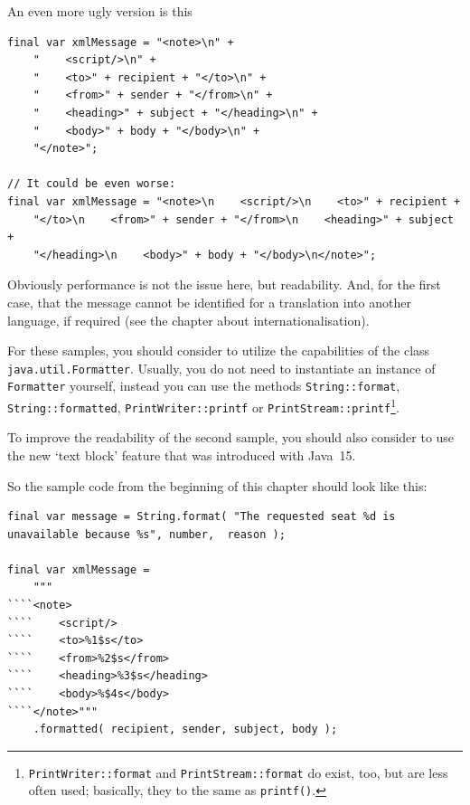 An even more ugly version is this
\begin{lstlisting}
final var xmlMessage = "<note>\n" +
    "    <script/>\n" +
    "    <to>" + recipient + "</to>\n" +
    "    <from>" + sender + "</from>\n" +
    "    <heading>" + subject + "</heading>\n" +
    "    <body>" + body + "</body>\n" +
    "</note>";
    
// It could be even worse:    
final var xmlMessage = "<note>\n    <script/>\n    <to>" + recipient +
    "</to>\n    <from>" + sender + "</from>\n    <heading>" + subject + 
    "</heading>\n    <body>" + body + "</body>\n</note>";
\end{lstlisting}

Obviously performance is not the issue here, but readability. And, for the first case, that the message cannot be identified for a translation into another language, if required (see the chapter  about internationalisation).

For these samples, you should consider to utilize the capabilities of the class \lstinline|java.util.Formatter|\autocite{ORACLE_DOC_FORMATTER_CLASS}. Usually, you do not need to instantiate an instance of \lstinline|Formatter| yourself, instead you can use the methods \lstinline|String::format|\autocite{ORACLE_DOC_STRING:format}, \lstinline|String::formatted|\autocite{ORACLE_DOC_STRING:formatted}, \lstinline|PrintWriter::printf|\autocite{ORACLE_DOC_PRINTWRITER:printf} or \lstinline|PrintStream::printf|\autocite{ORACLE_DOC_PRINTSTREAM:printf}\footnote{\lstinline|PrintWriter::format|\autocite{ORACLE_DOC_PRINTWRITER:format} and \lstinline|PrintStream::format|\autocite{ORACLE_DOC_PRINTSTREAM:format} do exist, too, but are less often used; basically, they to the same as \lstinline|printf()|.}.

To improve the readability of the second sample, you should also consider to use the new ‘text block’ feature\autocite{ORACLE_DOC_LANGUAGE_SPECIFICATION:TextBlocks,Laskey:TextBlocks} that was introduced with Java~15.

So the sample code from the beginning of this chapter should look like this:
\begin{lstlisting}
final var message = String.format( "The requested seat %d is unavailable because %s", number,  reason );

final var xmlMessage = 
    """
````<note>
````    <script/>
````    <to>%1$s</to>
````    <from>%2$s</from>
````    <heading>%3$s</heading>
````    <body>%$4s</body>
````</note>"""
    .formatted( recipient, sender, subject, body );
\end{lstlisting}

